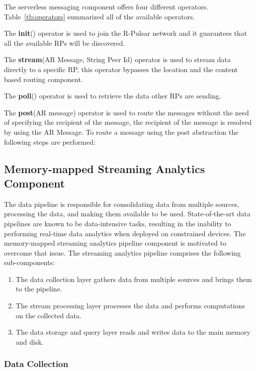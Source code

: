 The serverless messaging component offers four different operators. Table~\ref{tb:operators} summarized all of the available operators.

The \textbf{init}() operator is used to join the R-Pulsar network and it guarantees that all the available RPs will be discovered.

The \textbf{stream}(AR Message, String Peer Id) operator is used to stream data directly to a specific RP, this operator bypasses the location and the content based routing component.

The \textbf{poll}() operator is used to retrieve the data other RPs are sending.

The \textbf{post}(AR message) operator is used to route the messages without the need of specifying the recipient of the message, the recipient of the message is resolved by using the AR Message. To route a message using the post abstraction the following steps are performed:

\subsection{Memory-mapped Streaming Analytics Component}
The data pipeline is responsible for consolidating data from multiple sources, processing the data, and making them available to be used. State-of-the-art data pipelines are known to be data-intensive tasks, resulting in the inability to performing real-time data analytics when deployed on constrained devices. The memory-mapped streaming analytics pipeline component is motivated to overcome that issue. The streaming analytics pipeline comprises the following sub-components: 

\begin{enumerate}

\item The data collection layer gathers data from multiple sources and brings them to the pipeline.
\item The stream processing layer processes the data and performs computations on the collected data.   
\item The data storage and query layer reads and writes data to the main memory and disk.

\end{enumerate}

\subsubsection{Data Collection}

